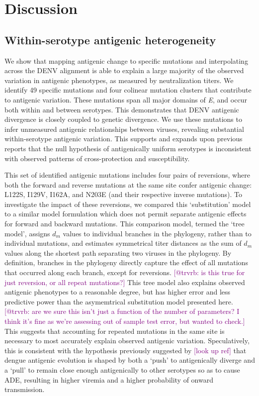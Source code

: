 \documentclass[11pt,oneside,letterpaper]{article}
\def\sbc#1{\textcolor{purple}{[#1]}}
\begin{document}
\pagebreak

\section*{Discussion}

\subsection*{Within-serotype antigenic heterogeneity}

We show that mapping antigenic change to specific mutations and interpolating across the DENV alignment is able to explain a large majority of the observed variation in antigenic phenotypes, as measured by neutralization titers.
We identify 49 specific mutations and four colinear mutation clusters that contribute to antigenic variation.
These mutations span all major domains of \textit{E}, and occur both within and between serotypes.
This demonstrates that DENV antigenic divergence is closely coupled to genetic divergence.
We use these mutations to infer unmeasured antigenic relationships between viruses, revealing substantial within-serotype antigenic variation.
This supports and expands upon previous reports \citep{katzelnick2015dengue} that the null hypothesis of antigenically uniform serotypes is inconsistent with observed patterns of cross-protection and susceptibility.

This set of identified antigenic mutations includes four pairs of reversions, where both the forward and reverse mutations at the same site confer antigenic change: L122S, I129V, I162A, and N203E (and their respective inverse mutations).
To investigate the impact of these reversions, we compared this `substitution' model to a similar model formulation which does not permit separate antigenic effects for forward and backward mutations.
This comparison model, termed the `tree model', assigns $d_m$ values to individual branches in the phylogeny, rather than to individual mutations, and estimates symmetrical titer distances as the sum of $d_m$ values along the shortest path separating two viruses in the phylogeny.
By definition, branches in the phylogeny directly capture the effect of all mutations that occurred along each branch, except for reversions.
\sbc{@trvrb: is this true for just reversion, or all repeat mutations?}
This tree model also explains observed antigenic phenotypes to a reasonable degree, but has higher error and less predictive power than the asymemtrical substitution model presented here.
\sbc{@trvrb: are we sure this isn't just a function of the number of parameters? I think it's fine as we're assessing out of sample test error, but wanted to check.}
This suggests that accounting for repeated mutations in the same site is necessary to most accurately explain observed antigenic variation.
Speculatively, this is consistent with the hypothesis previously suggested by \sbc{look up ref} that dengue antigenic evolution is shaped by both a `push' to antigenically diverge and a `pull' to remain close enough antigenically to other serotypes so as to cause ADE, resulting in higher viremia and a higher probability of onward transmission.
\end{document}
